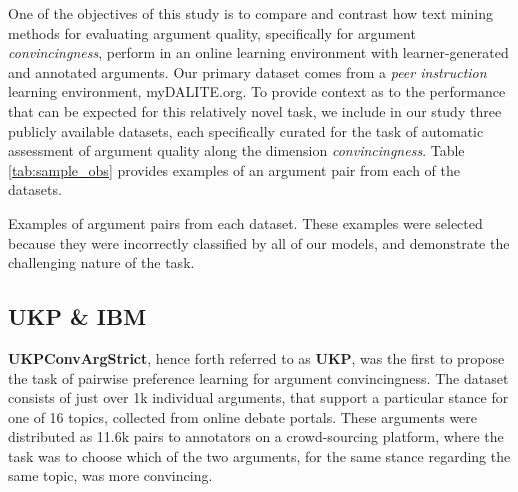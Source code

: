 \documentclass[runningheads]{llncs}
\begin{document}
One of the objectives of this study is to compare and contrast how text 
mining methods for evaluating argument quality, specifically for argument 
\textit{convincingness}, perform in an online learning environment with 
learner-generated and annotated arguments. 
Our primary dataset comes from a \textit{peer instruction} learning 
environment, myDALITE.org. 
To provide context as to the performance that can be expected for this 
relatively novel task, we include in our study three publicly available 
datasets, each specifically curated for the task of automatic assessment of 
argument quality along the dimension \textit{convincingness}. 
Table \ref{tab:sample_obs} provides examples of an argument pair 
from each of the datasets.


\begin{table}
	\caption{Examples of argument pairs from each dataset. These examples were 
	selected because they were incorrectly classified by all of our models, and 
	demonstrate the challenging nature of the task.}
	\label{tab:sample_obs}
	\begin{subtable}[t]{\textwidth}
	
	\end{subtable}
	\begin{subtable}[t]{\textwidth}
	
	\end{subtable}
	\begin{subtable}[t]{\textwidth}
	
	\end{subtable}
\end{table}



\subsection{UKP \& IBM}
\textbf{UKPConvArgStrict}\cite{habernal_which_2016}, hence forth referred to as 
\textbf{UKP}, was the first to propose the task of pairwise preference learning 
for argument convincingness. 
The dataset consists of just over 1k individual arguments, that support a 
particular stance for one of 16 topics, collected from online debate portals. 
These arguments were distributed as 11.6k pairs to annotators on a 
crowd-sourcing platform, where the task was to choose which of the two 
arguments, for the same stance regarding the same topic, was more convincing. 
\end{document}
